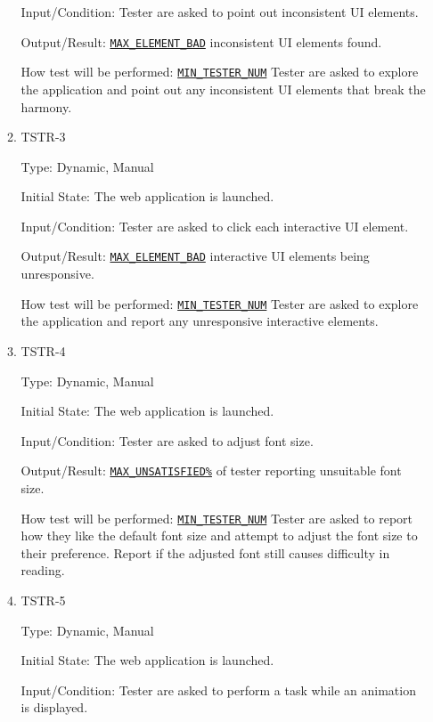 \documentclass[12pt, titlepage]{article}
\begin{document}
\begin{enumerate}
\begin{enumerate}
Input/Condition: Tester are asked to point out inconsistent UI elements.
					
Output/Result: \hyperref[MAX_ELEMENT_BAD]{\texttt{MAX\_ELEMENT\_BAD}} inconsistent UI elements found.
					
How test will be performed: \hyperref[MIN_TESTER_NUM]{\texttt{MIN\_TESTER\_NUM}} Tester are asked to explore the application and point out any inconsistent UI elements that break the harmony.

\item{TSTR-3\\}\label{TSTR-3}

Type: Dynamic, Manual
					
Initial State: The web application is launched.
					
Input/Condition: Tester are asked to click each interactive UI element.
					
Output/Result: \hyperref[MAX_ELEMENT_BAD]{\texttt{MAX\_ELEMENT\_BAD}} interactive UI elements being unresponsive.
					
How test will be performed: \hyperref[MIN_TESTER_NUM]{\texttt{MIN\_TESTER\_NUM}} Tester are asked to explore the application and report any unresponsive interactive elements.

\item{TSTR-4\\}\label{TSTR-4}

Type: Dynamic, Manual
					
Initial State: The web application is launched.
					
Input/Condition: Tester are asked to adjust font size.
					
Output/Result: \hyperref[MAX_UNSATISFIED]{\texttt{MAX\_UNSATISFIED\%}} of tester reporting unsuitable font size.
					
How test will be performed: \hyperref[MIN_TESTER_NUM]{\texttt{MIN\_TESTER\_NUM}} Tester are asked to report how they like the default font size and attempt to adjust the font size to their preference. Report if the adjusted font still causes difficulty in reading.

\item{TSTR-5\\}\label{TSTR-5}

Type: Dynamic, Manual
					
Initial State: The web application is launched.
					
Input/Condition: Tester are asked to perform a task while an animation is displayed.
					

\end{enumerate}
\end{enumerate}
\end{document}
